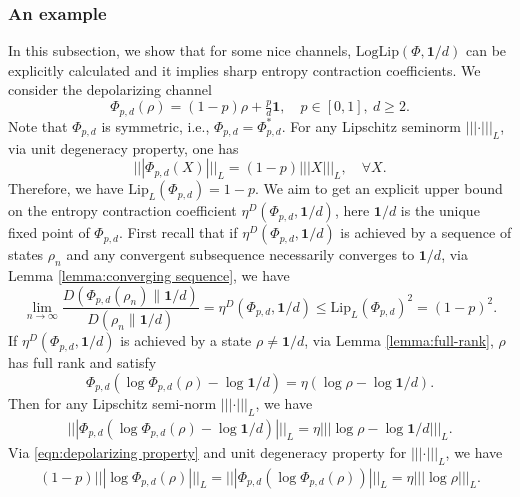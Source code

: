 \documentclass[11pt,reqno]{amsart}
\numberwithin{equation}{section}
\newcommand{\Lip}{\mathrm{Lip}}
\begin{document}
\subsubsection{An example} 
In this subsection, we show that for some nice channels, $\mathrm{LogLip}(\Phi,\textbf{1}/d)$ can be explicitly calculated and it implies sharp entropy contraction coefficients. We consider the depolarizing channel
\begin{equation}
    \Phi_{p,d}(\rho)=(1-p)\rho+\tfrac{p}{d} \textbf{1},\quad p\in [0,1],\ d\ge2.
\end{equation}
Note that $\Phi_{p,d}$ is symmetric, i.e., $\Phi_{p,d} = \Phi_{p,d}^*$. For any Lipschitz seminorm $|||\cdot|||_L$, via unit degeneracy property, one has 
\begin{equation}\label{eqn:depolarizing property}
    |||\Phi_{p,d}(X)|||_L = (1-p)|||X|||_L,\quad \forall X.
\end{equation}
Therefore, we have $\Lip_L(\Phi_{p,d}) = 1-p$. We aim to get an explicit upper bound on the entropy contraction coefficient $\eta^D(\Phi_{p,d}, \textbf{1}/d)$, here $\textbf{1}/d$ is the unique fixed point of $\Phi_{p,d}$.  First recall that if $\eta^D(\Phi_{p,d}, \textbf{1}/d)$ is achieved by a sequence of states $\rho_n$ and any convergent subsequence necessarily converges to $\textbf{1}/d$, via Lemma \ref{lemma:converging sequence}, we have 
\begin{equation}\label{eqn:upper 1 depolarizing}
     \lim_{n\to \infty}\frac{D(\Phi_{p,d}(\rho_n)\| \textbf{1}/d)}{D(\rho_n\| \textbf{1}/d)} = \eta^D(\Phi_{p,d}, \textbf{1}/d) \le \Lip_L(\Phi_{p,d})^2 = (1-p)^2.
\end{equation}
If $\eta^D(\Phi_{p,d}, \textbf{1}/d)$ is achieved by a state $\rho \neq \textbf{1}/d$, via Lemma \ref{lemma:full-rank}, $\rho$ has full rank and satisfy
\begin{equation}
    \Phi_{p,d}(\log \Phi_{p,d}(\rho) - \log \textbf{1}/d) = \eta(\log \rho - \log \textbf{1}/d). 
\end{equation}
Then for any Lipschitz semi-norm $|||\cdot|||_L$, we have 
\begin{align*}
    |||\Phi_{p,d}\left(\log \Phi_{p,d}(\rho) - \log \textbf{1}/d\right )|||_L= \eta  |||\log \rho - \log \textbf{1}/d|||_L.
\end{align*}
Via \eqref{eqn:depolarizing property} and unit degeneracy property for $|||\cdot|||_L$, we have 
\begin{align}\label{eqn:upper 2 depolarizing}
    (1-p)|||\log \Phi_{p,d}(\rho)|||_L = |||\Phi_{p,d}\left(\log \Phi_{p,d}(\rho)\right) |||_L= \eta  |||\log \rho|||_L.
\end{align}
\end{document}
